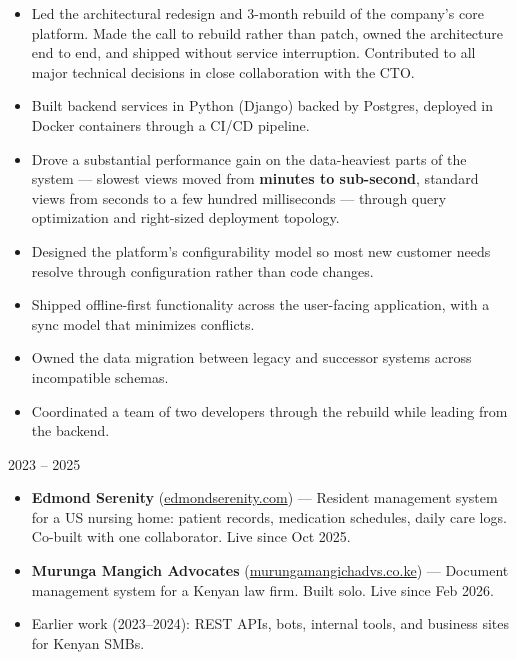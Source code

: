 \documentclass[11pt,a4paper]{article}
\newcommand{\role}[2]{%
  \noindent{\poppinssemibold\fontsize{11pt}{13pt}\selectfont #1}\hfill{\small\color{muted} #2}\par
}
\begin{document}
\begin{itemize}
  \item Led the architectural redesign and 3-month rebuild of the company's core platform. Made the call to rebuild rather than patch, owned the architecture end to end, and shipped without service interruption. Contributed to all major technical decisions in close collaboration with the CTO.
  \item Built backend services in Python (Django) backed by Postgres, deployed in Docker containers through a CI/CD pipeline.
  \item Drove a substantial performance gain on the data-heaviest parts of the system --- slowest views moved from \textbf{minutes to sub-second}, standard views from seconds to a few hundred milliseconds --- through query optimization and right-sized deployment topology.
  \item Designed the platform's configurability model so most new customer needs resolve through configuration rather than code changes.
  \item Shipped offline-first functionality across the user-facing application, with a sync model that minimizes conflicts.
  \item Owned the data migration between legacy and successor systems across incompatible schemas.
  \item Coordinated a team of two developers through the rebuild while leading from the backend.
\end{itemize}

\vspace{4pt}

\role{Freelance Full-Stack Developer}{2023 -- 2025}

\begin{itemize}
  \item \textbf{Edmond Serenity} (\href{https://edmondserenity.com}{edmondserenity.com}) --- Resident management system for a US nursing home: patient records, medication schedules, daily care logs. Co-built with one collaborator. Live since Oct 2025.
  \item \textbf{Murunga Mangich Advocates} (\href{https://murungamangichadvs.co.ke}{murungamangichadvs.co.ke}) --- Document management system for a Kenyan law firm. Built solo. Live since Feb 2026.
  \item Earlier work (2023--2024): REST APIs, bots, internal tools, and business sites for Kenyan SMBs.
\end{itemize}

\end{document}

